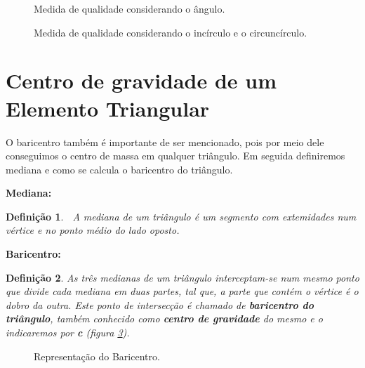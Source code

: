 \documentclass[12pt,a4paper]{book}
\newtheorem{Def}{Defini\c{c}\~{a}o}
\begin{document}
\begin{figure}[htbp]
  \begin{center}
    \leavevmode
    
    \caption{Medida de qualidade considerando o \^angulo.}
    \label{figura_analise_angulo}
  \end{center}
\end{figure}

\begin{figure}[htbp]
  \begin{center}
    \leavevmode
    
    \caption{Medida de qualidade considerando o inc\'irculo e o circunc\'irculo.}
    \label{figura_analise_incirc_circunc}
  \end{center}
\end{figure}


\section[Baricentro]{Centro de gravidade de um Elemento Triangular}

O baricentro tamb\'{e}m \'{e} importante de ser mencionado, pois por meio
dele conseguimos o centro de massa em qualquer tri\^{a}ngulo. Em seguida
definiremos mediana e como se calcula o baricentro do tri\^{a}ngulo.

\textbf{Mediana:}

\begin{Def}
\textbf{\ }A mediana de um tri\^{a}ngulo \'{e} um segmento com extemidades
num \textit{v\'{e}rtice} e no ponto m\'{e}dio do lado oposto.
\end{Def}

\textbf{Baricentro:}

\begin{Def}
As tr\^{e}s medianas de um tri\^{a}ngulo interceptam-se num mesmo ponto que
divide cada mediana em duas partes, tal que, a parte que cont\'{e}m o 
\textit{v\'{e}rtice} \'{e} o dobro da outra. Este ponto de intersec\c{c}\~{a}o \'{e} chamado de \textbf{baricentro do tri\^{a}ngulo}, tamb\'{e}m conhecido como 
\textbf{centro de gravidade} do mesmo e o indicaremos por \textbf{c} 
(figura \ref{fig5_chapter2}).
\end{Def}


\begin{figure}[htbp]
  \begin{center}
    \leavevmode
    
    \caption{Representa\c{c}\~{a}o do Baricentro.}
    \label{fig5_chapter2}
  \end{center}
\end{figure}
\end{document}
